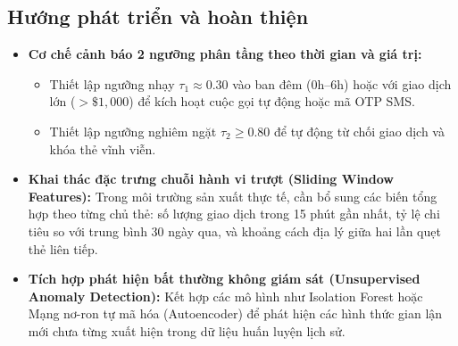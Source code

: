\documentclass[13pt,a4paper]{extarticle}
\begin{document}
\subsection{Hướng phát triển và hoàn thiện}
\begin{itemize}
    \item \textbf{Cơ chế cảnh báo 2 ngưỡng phân tầng theo thời gian và giá trị:} 
    \begin{itemize}
        \item Thiết lập ngưỡng nhạy $\tau_1 \approx 0.30$ vào ban đêm (0h--6h) hoặc với giao dịch lớn ($> \$1,000$) để kích hoạt cuộc gọi tự động hoặc mã OTP SMS.
        \item Thiết lập ngưỡng nghiêm ngặt $\tau_2 \ge 0.80$ để tự động từ chối giao dịch và khóa thẻ vĩnh viễn.
    \end{itemize}
    \item \textbf{Khai thác đặc trưng chuỗi hành vi trượt (Sliding Window Features):} Trong môi trường sản xuất thực tế, cần bổ sung các biến tổng hợp theo từng chủ thẻ: số lượng giao dịch trong 15 phút gần nhất, tỷ lệ chi tiêu so với trung bình 30 ngày qua, và khoảng cách địa lý giữa hai lần quẹt thẻ liên tiếp.
    \item \textbf{Tích hợp phát hiện bất thường không giám sát (Unsupervised Anomaly Detection):} Kết hợp các mô hình như Isolation Forest hoặc Mạng nơ-ron tự mã hóa (Autoencoder) để phát hiện các hình thức gian lận mới chưa từng xuất hiện trong dữ liệu huấn luyện lịch sử.
\end{itemize}

\newpage



\newpage
\appendix
\end{document}
